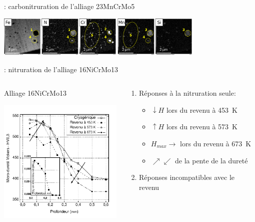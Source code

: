 \documentclass[aspectratio=169,pdf,t]{beamer}
\begin{document}
\begin{frame}{\insertsection}{\insertsubsection: carbonitruration de l'alliage 23MnCrMo5}
{  	\begin{center}	  
  		\includegraphics[width=10cm]{figures/tem-auto-cartography}
  	\end{center}
	}
	\vfill{}
\end{frame}


\begin{frame}{\insertsection}{\insertsubsection: nitruration de l'alliage 16NiCrMo13}
  \begin{columns}[T]
    \begin{column}{0.45\textwidth}
      \centering{}
      Alliage 16NiCrMo13
      \vspace{0.3cm}
      
      \includegraphics[width=6cm]{figures/hardness-nitriding}
    \end{column}
    \begin{column}{0.55\textwidth}
      \begin{enumerate}
        \item Réponses à la nitruration seule:
        \begin{itemize}
          \item $\downarrow{}H$ lors du revenu à \SI{453}{\kelvin}
          \item $\uparrow{}H$ lors du revenu à \SI{573}{\kelvin}
          \item $H_{max}\rightarrow$ lors du revenu à \SI{673}{\kelvin}
          \item $\nearrow\swarrow$ de la pente de la dureté
        \end{itemize}
        \vspace{0.5cm}
       
        \item R\'eponses incompatibles avec le revenu
        \vspace{0.5cm}


\end{enumerate}
\end{column}
\end{columns}
\end{frame}
\end{document}
